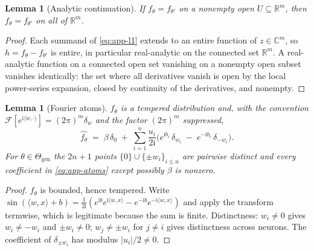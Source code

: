 \documentclass[10pt,letterpaper]{article}
\newtheorem{lemma}[theorem]{Lemma}
\theoremstyle{definition}
\newcommand{\R}{\mathbb{R}}
\newcommand{\C}{\mathbb{C}}
\newcommand{\Thgen}{\Theta_{\mathrm{gen}}}
\begin{document}
\begin{lemma}[Analytic continuation]\label{lem:app-analytic}
If $f_\theta = f_{\theta'}$ on a nonempty open $U \subseteq \R^m$, then $f_\theta = f_{\theta'}$
on all of $\R^m$.
\end{lemma}

\begin{proof}
Each summand of \eqref{eq:app-l1} extends to an entire function of $z \in \C^m$, so
$h = f_\theta - f_{\theta'}$ is entire, in particular real-analytic on the connected set $\R^m$. A
real-analytic function on a connected open set vanishing on a nonempty open subset vanishes
identically: the set where all derivatives vanish is open by the local power-series expansion,
closed by continuity of the derivatives, and nonempty.
\end{proof}

\begin{lemma}[Fourier atoms]\label{lem:app-atoms}
$f_\theta$ is a tempered distribution and, with the convention
$\mathcal F[e^{\mathrm i\langle w,\cdot\rangle}] = (2\pi)^m \delta_w$ and the factor $(2\pi)^m$
suppressed,
\begin{equation}
\widehat{f_\theta} \;=\; \beta\,\delta_0 \;+\; \sum_{i=1}^{n} \frac{u_i}{2\mathrm i}
\Big( e^{\mathrm i b_i}\,\delta_{w_i} \;-\; e^{-\mathrm i b_i}\,\delta_{-w_i} \Big).
\label{eq:app-atoms}
\end{equation}
For $\theta \in \Thgen$ the $2n+1$ points $\{0\} \cup \{\pm w_i\}_{i \le n}$ are pairwise distinct
and every coefficient in \eqref{eq:app-atoms} except possibly $\beta$ is nonzero.
\end{lemma}

\begin{proof}
$f_\theta$ is bounded, hence tempered. Write
$\sin(\langle w,x\rangle + b) = \frac{1}{2\mathrm i}(e^{\mathrm i b}e^{\mathrm i\langle w,x\rangle}
- e^{-\mathrm i b}e^{-\mathrm i\langle w,x\rangle})$ and apply the transform termwise, which is
legitimate because the sum is finite. Distinctness: $w_i \neq 0$ gives $w_i \neq -w_i$ and
$\pm w_i \neq 0$; $w_j \neq \pm w_i$ for $j\neq i$ gives distinctness across neurons. The
coefficient of $\delta_{\pm w_i}$ has modulus $|u_i|/2 \neq 0$.
\end{proof}
\end{document}
